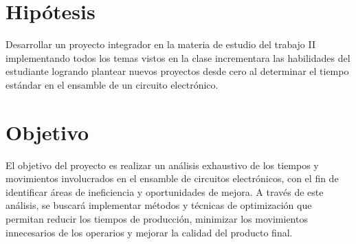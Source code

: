     \section{Hipótesis}
% 
% 
Desarrollar un proyecto integrador en la materia de estudio del trabajo II implementando todos los temas vistos en la clase incrementara las habilidades del estudiante logrando plantear nuevos proyectos desde cero al determinar el tiempo estándar en el ensamble de un circuito electrónico.
% 
% 
% 
%  
    \section{Objetivo}

% 
% 
% 
%
El objetivo del proyecto es realizar un análisis exhaustivo de los tiempos y movimientos involucrados en el ensamble de circuitos electrónicos, con el fin de identificar áreas de ineficiencia y oportunidades de mejora. A través de este análisis, se buscará implementar métodos y técnicas de optimización que permitan reducir los tiempos de producción, minimizar los movimientos innecesarios de los operarios y mejorar la calidad del producto final.
%
%
